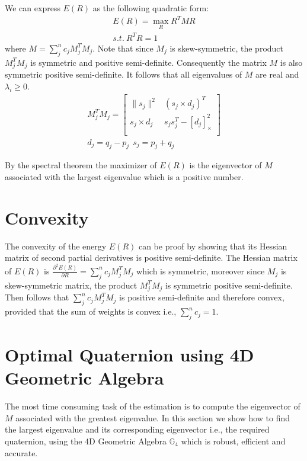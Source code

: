 \documentclass{birkjour}
\numberwithin{equation}{section}
\begin{document}
We can express $E(R)$ as the following quadratic form:
\begin{eqnarray}
E(R) = \max_R R^T M R\\
s.t. \ R^T R = 1  \nonumber
\end{eqnarray}
where $M = \sum_j^n { c_j M_j^T M_j}$. Note that since $M_j$ is skew-symmetric, the product $M_j^T M_j$ is symmetric and positive semi-definite.
Consequently the matrix $M$ is also symmetric positive semi-definite. It follows that all eigenvalues of $M$ are real and $\lambda_i \geq 0$.
\begin{eqnarray}
	M_j^T M_j = 
	\left[\begin{array}{cc}
		\| s_j \|^2       &         (s_j \times d_j)^T \\
		s_j \times d_j  &    s_j s_j^T - \left[ d_j \right]^2_\times \\
	\end{array}\right]\\
	d_j = q_j - p_j \ \ s_j = p_j + q_j  \nonumber
\end{eqnarray}

By the spectral theorem the maximizer of $E(R)$ is the eigenvector of $M$ associated with the largest eigenvalue which is a positive number.

\section{Convexity}

The convexity of the energy $E(R)$ can be proof by showing that its Hessian matrix of second partial derivatives is positive semi-definite. The Hessian matrix of $E(R)$ is $\frac{\partial^2 E(R)}{\partial R} = \sum_j^n { c_j M_j^T M_j}$ which is symmetric, moreover since $M_j$ is skew-symmetric matrix, the product $M_j^T M_j$ is symmetric positive semi-definite. Then follows that $\sum_j^n { c_j M_j^T M_j}$ is positive semi-definite and therefore convex, provided that the sum of weights is convex i.e., $\sum_j^n { c_j } = 1$.

\section{Optimal Quaternion using 4D Geometric Algebra}

The most time consuming task of the estimation is to compute the eigenvector of $M$ associated with the greatest eigenvalue. In this section we show how to find the largest eigenvalue and its corresponding eigenvector i.e., the required quaternion, using the 4D Geometric Algebra $ \mathbb{G}_4$ which is robust, efficient and accurate.
\end{document}
